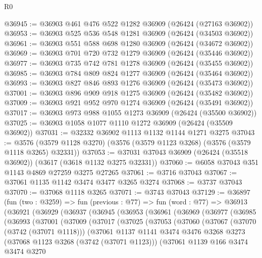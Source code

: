 \begin{lexlean}{R0}
\begin{coremodule}
@36945 := @36903 @461 @476 @522 @1282 @36909 (@26424 (@27163 @36902))
@36953 := @36903 @525 @536 @548 @1281 @36909 (@26424 (@34503 @36902))
@36961 := @36903 @551 @588 @698 @1280 @36909 (@26424 (@34672 @36902))
@36969 := @36903 @701 @720 @732 @1279 @36909 (@26424 (@35446 @36902))
@36977 := @36903 @735 @742 @781 @1278 @36909 (@26424 (@35455 @36902))
@36985 := @36903 @784 @809 @824 @1277 @36909 (@26424 (@35464 @36902))
@36993 := @36903 @827 @846 @893 @1276 @36909 (@26424 (@35473 @36902))
@37001 := @36903 @896 @909 @918 @1275 @36909 (@26424 (@35482 @36902))
@37009 := @36903 @921 @952 @970 @1274 @36909 (@26424 (@35491 @36902))
@37017 := @36903 @973 @988 @1055 @1273 @36909 (@26424 (@35500 @36902))
@37025 := @36903 @1058 @1077 @1110 @1272 @36909 (@26424 (@35509 @36902))
@37031 := @32332 @36902 @1113 @1132 @1144 @1271 @3275
@37043 := @3576 (@3579 @1128 @3270) (@3576 (@3579 @1123 @3268) (@3576 (@3579 @1118 @3265) @32331))
@37053 := @37031 @37043 @36909 (@26424 (@35518 @36902)) (@3617 (@3618 @1132 @3275 @32331))
@37060 := @6058 @37043 @351 @1143 @4869 @27259 @3275 @27265
@37061 := @3716 @37043
@37067 := @37061 @1135 @1142 @3474 @3477 @3265 @3274
@37068 := @3737 @37043
@37070 := @37068 @1118 @3265
@37071 := @3743 @37043
@37129 := @36897
    (fun (two : @3259) =>
    fun (previous : @77) =>
    fun (word : @77) =>
    @36913
      (@36921
        (@36929
          (@36937
            (@36945
              (@36953
                (@36961
                  (@36969
                    (@36977
                      (@36985
                        (@36993
                          (@37001
                            (@37009
                              (@37017
                                (@37025
                                  (@37053
                                    (@37060
                                      (@37067
                                        (@37070 (@3742 (@37071 @1118)))
                                        (@37061
                                          @1137
                                          @1141
                                          @3474
                                          @3476
                                          @3268
                                          @3273
                                          (@37068 @1123 @3268 (@3742 (@37071 @1123)))
                                          (@37061
                                            @1139
                                            @166
                                            @3474
                                            @3474
                                            @3270

\end{coremodule}
\end{lexlean}
